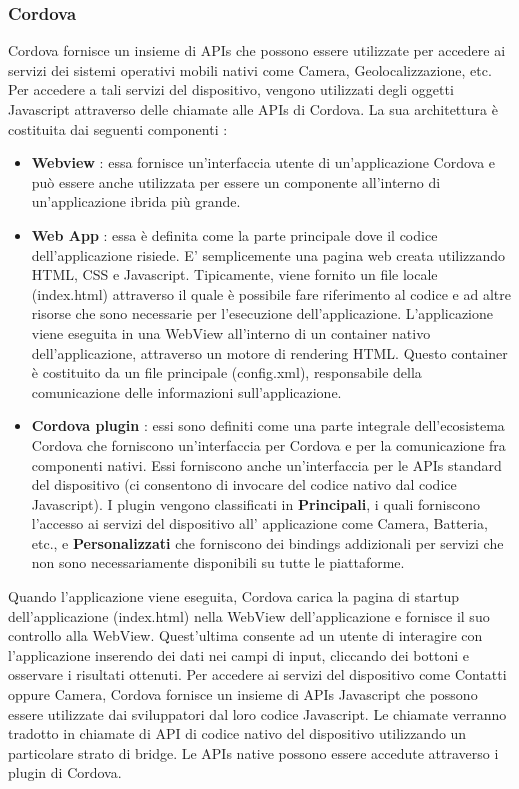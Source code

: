 \documentclass[12pt]{report}
\begin{document}
\subsubsection{Cordova}
Cordova fornisce un insieme di APIs che possono essere utilizzate per accedere ai servizi dei sistemi operativi mobili nativi come Camera, Geolocalizzazione, etc. Per accedere a tali servizi del dispositivo, vengono utilizzati degli oggetti Javascript attraverso delle chiamate alle APIs di Cordova. La sua architettura è costituita dai seguenti componenti :
\begin{itemize}
\item \textbf{Webview} : essa fornisce un'interfaccia utente di un'applicazione Cordova e può essere anche utilizzata per essere un componente all'interno di un'applicazione ibrida più grande.
\item \textbf{Web App} : essa è definita come la parte principale dove il codice dell'applicazione risiede. E' semplicemente una pagina web creata utilizzando HTML, CSS e Javascript. Tipicamente, viene fornito un file locale (index.html) attraverso il quale è possibile fare riferimento al codice e ad altre risorse che sono necessarie per l'esecuzione dell'applicazione. L'applicazione viene eseguita in una WebView all'interno di un container nativo dell'applicazione, attraverso un motore di rendering HTML. Questo container è costituito da un file principale (config.xml), responsabile della comunicazione delle informazioni sull'applicazione.
\item \textbf{Cordova plugin} : essi sono definiti come una parte integrale dell'ecosistema Cordova che forniscono un'interfaccia per Cordova e per la comunicazione fra componenti nativi. Essi forniscono anche un'interfaccia per le APIs standard del dispositivo (ci consentono di invocare del codice nativo dal codice Javascript). I plugin vengono classificati in \textbf{Principali}, i quali forniscono l'accesso ai servizi del dispositivo all' applicazione come Camera, Batteria, etc., e \textbf{Personalizzati} che forniscono dei bindings addizionali per servizi che non sono necessariamente disponibili su tutte le piattaforme.
\end{itemize}
Quando l'applicazione viene eseguita, Cordova carica la pagina di startup dell'applicazione (index.html) nella WebView dell'applicazione e fornisce il suo controllo alla WebView. Quest'ultima consente ad un utente di interagire con l'applicazione inserendo dei dati nei campi di input, cliccando dei bottoni e osservare i risultati ottenuti. Per accedere ai servizi del dispositivo come Contatti oppure Camera, Cordova fornisce un insieme di APIs Javascript che possono essere utilizzate dai sviluppatori dal loro codice Javascript. Le chiamate verranno tradotto in chiamate di API di codice nativo del dispositivo utilizzando un particolare strato di bridge. Le APIs native possono essere accedute attraverso i plugin di Cordova.
\end{document}
